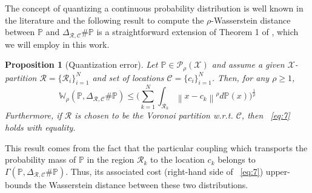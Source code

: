 \documentclass[11pt, a4paper, oneside,reqno]{amsart}
\theoremstyle{plain}
\newtheorem{proposition}[theorem]{Proposition}
\def\prob{\mathbb{P}}
\def\wasserstein{{\mathbb{W}}}
\newcommand{\norm}[1]{\left\lVert#1\right\rVert}
\def\sP{{\mathcal{P}}}
\def\sR{{\mathcal{R}}}
\def\sX{{\mathcal{X}}}
\def\bsR{{\bm{\mathcal{R}}}}
\def\bsC{{\bm{\mathcal{C}}}}
\begin{document}
The concept of quantizing a continuous probability distribution is well known in the literature \cite{graf2000foundations, ambrogioni2018wasserstein, adams2024finite} and the following result to compute the $\rho$-Wasserstein distance between $\prob$ and $\Delta_{\bsR, \bsC} \# \prob$ is a straightforward extension of Theorem 1 of \cite{ambrogioni2018wasserstein}, which we will employ in this work.
\begin{proposition}[Quantization error]\label{prop:compute-theta-d}
    Let $\prob \in \sP_\rho (\sX)$ and assume a given $\sX$-partition $\bsR = \big\{ \sR_i \big\}_{i=1}^N$ and set of locations $\bsC = \big\{c_i\big\}_{i=1}^N$. Then, for any $\rho \geq 1$,
    \begin{equation}\label{eq:7}
        \wasserstein_\rho(\prob, \Delta_{\bsR, \bsC} \# \prob) \leq \bigg( \sum_{k=1}^N \int_{\sR_k} \norm{x-c_k}^\rho d\prob(x) \bigg)^\frac{1}{\rho}
    \end{equation}
    Furthermore, if $\bsR$ is chosen to be the Voronoi partition w.r.t. $\bsC$, then
    ~\eqref{eq:7} holds with equality. 
\end{proposition}
This result comes from the fact that the particular coupling which transports the probability mass of $\prob$ in the region $\sR_k$ to the location $c_k$ belongs to $\Gamma(\prob, \Delta_{\bsR, \bsC}\#\prob)$. Thus, its associated cost (right-hand side of ~\eqref{eq:7}) upper-bounds the Wasserstein distance between these two distributions.
\end{document}
